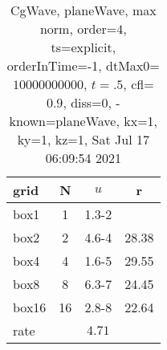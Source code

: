\begin{table}[H]\tableFont %
\begin{center}
\begin{tabular}{|l|c|c|c|} \hline 
grid  & N &  $ u $ & r \\ \hline 
      box1 &     1 & \num{1.3}{-2} &        \\ \hline
      box2 &     2 & \num{4.6}{-4} & 28.38  \\ \hline
      box4 &     4 & \num{1.6}{-5} & 29.55  \\ \hline
      box8 &     8 & \num{6.3}{-7} & 24.45  \\ \hline
     box16 &    16 & \num{2.8}{-8} & 22.64  \\ \hline
    rate             &       &  $4.71$       &       \\ \hline
\end{tabular}
\caption{CgWave, planeWave, max norm, order=$4$, ts=explicit, orderInTime=-1, dtMax0=$10000000000$, $t=.5$, cfl=$0.9$, diss=$0$, -known=planeWave, kx=1, ky=1, kz=1, Sat Jul 17 06:09:54 2021}\label{table:planeWaveOrder4max}
\end{center}
\end{table}

